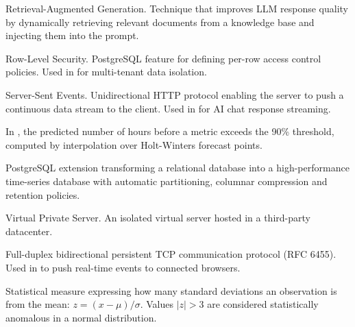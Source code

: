 \begin{description}[leftmargin=3.5cm, style=nextline, font=\bfseries\color{NavyBlue}]
  \item[RAG]
    Retrieval-Augmented Generation. Technique that improves LLM response quality
    by dynamically retrieving relevant documents from a knowledge base and
    injecting them into the prompt.

  \item[RLS]
    Row-Level Security. PostgreSQL feature for defining per-row access control
    policies. Used in \caimp{} for multi-tenant data isolation.

  \item[SSE]
    Server-Sent Events. Unidirectional HTTP protocol enabling the server to
    push a continuous data stream to the client. Used in \caimp{} for AI
    chat response streaming.

  \item[Time to critical]
    In \caimp{}, the predicted number of hours before a metric exceeds the
    90\% threshold, computed by interpolation over Holt-Winters forecast points.

  \item[TimescaleDB]
    PostgreSQL extension transforming a relational database into a
    high-performance time-series database with automatic partitioning,
    columnar compression and retention policies.

  \item[VPS]
    Virtual Private Server. An isolated virtual server hosted in a third-party
    datacenter.

  \item[WebSocket]
    Full-duplex bidirectional persistent TCP communication protocol (RFC 6455).
    Used in \caimp{} to push real-time events to connected browsers.

  \item[Z-score]
    Statistical measure expressing how many standard deviations an observation
    is from the mean: $z = (x - \mu) / \sigma$. Values $|z| > 3$ are
    considered statistically anomalous in a normal distribution.

\end{description}
